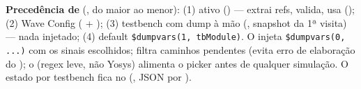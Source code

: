 \textbf{Precedência de } (, do maior ao menor): (1)  ativo () --- extrai refs, valida, usa (); (2) Wave Config ( + ); (3) testbench com dump à mão (, snapshot da 1ª visita) --- nada injetado; (4) default \lstinline|$dumpvars(1, tbModule)|. O  injeta \lstinline|$dumpvars(0, ...)| com os sinais escolhidos;  filtra caminhos pendentes (evita erro de elaboração do ); o  (regex leve, não Yosys) alimenta o picker antes de qualquer simulação. O estado por testbench fica no  (, JSON por ).
